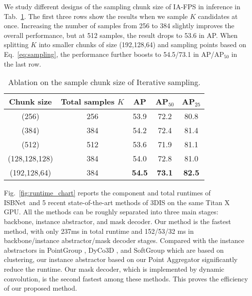 \documentclass[10pt,twocolumn,letterpaper]{article}
\def\Approach{ISBNet}
\begin{document}
 We study different designs of the sampling chunk size of IA-FPS in inference in Tab.~\ref{tab:ablation_iterative}. The first three rows show the results when we sample $K$ candidates at once. Increasing the number of samples from 256 to 384 slightly improves the overall performance, but at 512 samples, the result drops to 53.6 in AP. When splitting $K$ into smaller chunks of size (192,128,64) and sampling points based on Eq.~\eqref{eq:sampling}, the performance further boosts to 54.5/73.1 in AP/AP$_{50}$ in the last row.

\begin{table} 
\small
\centering
\setlength{\tabcolsep}{6pt}
\begin{tabular}{c|c|ccc}
\toprule
\textbf{Chunk size} & \textbf{Total samples $K$} &  \textbf{AP}  & \textbf{AP$_{50}$} & \textbf{AP$_{25}$} \\
\midrule
(256) & 256 & 53.9 & 72.2 & 80.8 \\ 
(384) & 384 & 54.2 & 72.4 & 81.4 \\ 
(512) & 512 & 53.6 & 71.9 & 81.1 \\ 
(128,128,128) & 384 & 54.0 & 72.8 & 81.0 \\
(192,128,64) & 384 & \textbf{54.5} & \textbf{73.1} &  \textbf{82.5} \\ 
\bottomrule
\end{tabular}
\vspace{-4pt}
\caption{Ablation on the sample chunk size of Iterative sampling.}
\label{tab:ablation_iterative}
\vspace{-16pt}
\end{table}

 Fig.~\ref{fig:runtime_chart} reports the component and total runtimes of \Approach~and 5 recent state-of-the-art methods of 3DIS on the same Titan X GPU. All the methods can be roughly separated into three main stages: backbone, instance abstractor, and mask decoder. Our method is the fastest method, with only 237ms in total runtime and 152/53/32
ms in backbone/instance abstractor/mask decoder stages. Compared with the instance abstractors in PointGroup \cite{jiang2020pointgroup}, DyCo3D \cite{he2021dyco3d}, and SoftGroup \cite{vu2022softgroup} which are based on clustering, our instance abstractor based on our Point Aggregator significantly reduce the runtime. Our mask decoder, which is implemented by dynamic convolution, is the second fastest among these methods. This proves the efficiency of our proposed method. 
\end{document}
